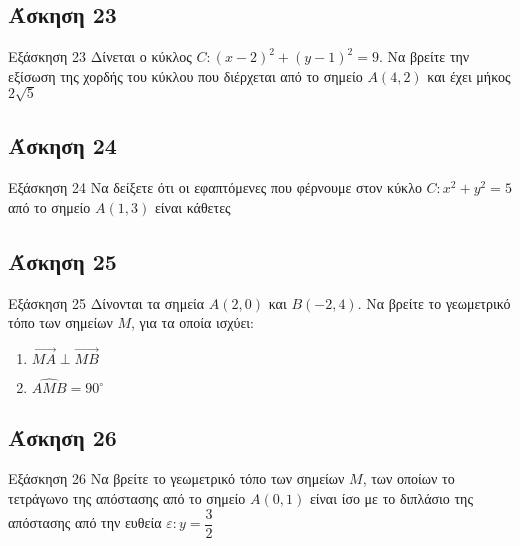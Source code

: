\documentclass[greek]{beamer}
\begin{document}
\subsection{Άσκηση 23}
\begin{frame}[label=Άσκηση23,t]{Εξάσκηση 23}
  Δίνεται ο κύκλος $C:(x-2)^2+(y-1)^2=9$. Να βρείτε την εξίσωση της χορδής του κύκλου που διέρχεται από το σημείο $Α(4,2)$ και έχει μήκος $2\sqrt{5}$

\end{frame}

\subsection{Άσκηση 24}
\begin{frame}[label=Άσκηση24,t]{Εξάσκηση 24}
  Να δείξετε ότι οι εφαπτόμενες που φέρνουμε στον κύκλο $C:x^2+y^2=5$ από το σημείο $Α(1,3)$ είναι κάθετες

\end{frame}

\subsection{Άσκηση 25}
\begin{frame}[label=Άσκηση25,t]{Εξάσκηση 25}
  Δίνονται τα σημεία $Α(2,0)$ και $Β(-2,4)$. Να βρείτε το γεωμετρικό τόπο των σημείων $Μ$, για τα οποία ισχύει:
  \begin{enumerate}
    \item<1-> $\overrightarrow{ΜΑ}\perp\overrightarrow{ΜΒ}$
    \item<2-> $\widehat{ΑΜΒ}=90^{\circ}$
  \end{enumerate}

\end{frame}

\subsection{Άσκηση 26}
\begin{frame}[label=Άσκηση26,t]{Εξάσκηση 26}
  Να βρείτε το γεωμετρικό τόπο των σημείων $Μ$, των οποίων το τετράγωνο της απόστασης από το σημείο $Α(0,1)$ είναι ίσο με το διπλάσιο της απόστασης από την ευθεία $ε:y=\dfrac{3}{2}$

\end{frame}
\end{document}
